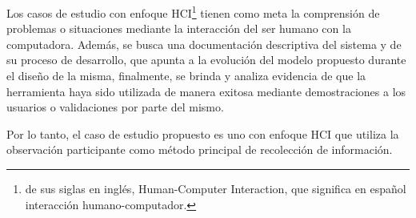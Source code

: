 Los casos de estudio con enfoque HCI\footnote{de sus siglas en inglés, Human-Computer Interaction, que significa en español interacción humano-computador.} tienen como meta la comprensión de problemas o situaciones mediante la interacción del ser humano con la computadora. Además, se busca una documentación descriptiva del sistema y de su proceso de desarrollo, que apunta a la evolución del modelo propuesto durante el diseño de la misma, finalmente, se brinda y analiza evidencia de que la herramienta haya sido utilizada de manera exitosa mediante demostraciones a los usuarios o validaciones por parte del mismo\citep{lazar_research_2010}. 

Por lo tanto, el caso de estudio propuesto es uno con enfoque HCI que utiliza la observación participante como método principal de recolección de información.